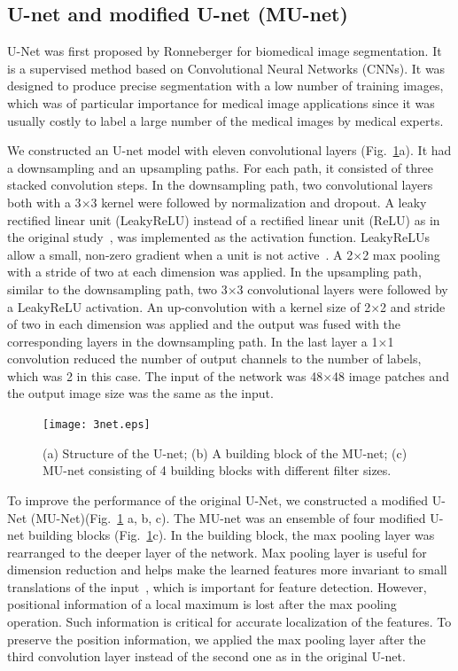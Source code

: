 \documentclass{osa-article}
\begin{document}
\subsection{U-net and modified U-net (MU-net)}
U-Net was first proposed by Ronneberger \cite{ronneberger2015u} for biomedical image segmentation. It is a supervised method based on Convolutional Neural Networks (CNNs). It was designed to produce precise segmentation with a low number of training images, which was of particular importance for medical image applications since it was usually costly to label a large number of the medical images by medical experts. 

We constructed an U-net model with eleven convolutional layers (Fig.~\ref{fig:U-net}a). It had a downsampling and an upsampling paths. For each path, it consisted of three stacked convolution steps. In the downsampling path, two convolutional layers both with a 3$\times$3 kernel were followed by normalization and dropout. A leaky rectified linear unit (LeakyReLU) instead of a rectified linear unit (ReLU) as in the original study~\cite{ronneberger2015u}, was implemented as the activation function. LeakyReLUs allow a small, non-zero gradient when a unit is not active~\cite{maas2013rectifier}. A 2$\times$2 max pooling with a stride of two at each dimension was applied. In the upsampling path, similar to the downsampling path, two 3$\times$3 convolutional layers were followed by a LeakyReLU activation. An up-convolution with a kernel size of 2$\times$2 and stride of two in each dimension was applied and the output was fused with the corresponding layers in the downsampling path. In the last layer a 1$\times$1 convolution reduced the number of output channels to the number of labels, which was 2 in this case. The input of the network was 48$\times$48 image patches and the output image size was the same as the input.



\begin{figure}[ht]
\centering
\texttt{[image: 3net.eps]}
\caption{(a) Structure of the U-net; (b) A building block of the MU-net; (c) MU-net consisting of 4 building blocks with different filter sizes.}
\label{fig:U-net}
\end{figure}


To improve the performance of the original U-Net, we constructed a modified U-Net (MU-Net)(Fig.~\ref{fig:U-net} a, b, c). The MU-net was an ensemble of four modified U-net building blocks (Fig.~\ref{fig:U-net}c). In the building block, the max pooling layer was rearranged to the deeper layer of the network. Max pooling layer is useful for dimension reduction and helps make the learned features more invariant to small translations of the input~\cite{bengio2015deep}, which is important for feature detection. However, positional information of a local maximum is lost after the max pooling operation. Such information is critical for accurate localization of the features. To preserve the position information, we applied the max pooling layer after the third convolution layer instead of the second one as in the original U-net.
\end{document}
